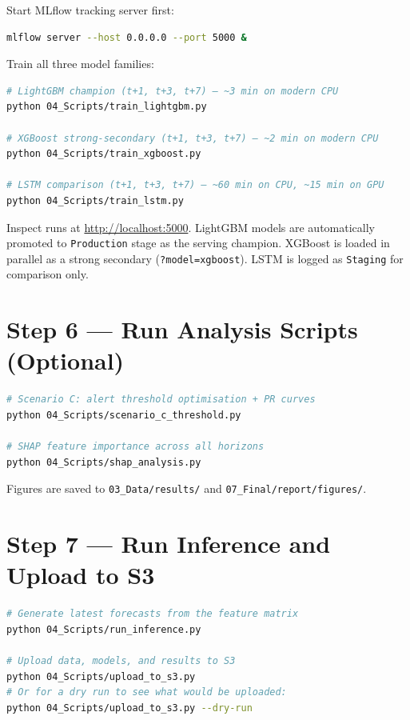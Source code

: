 Start MLflow tracking server first:

\begin{lstlisting}[language=bash]
mlflow server --host 0.0.0.0 --port 5000 &
\end{lstlisting}

Train all three model families:

\begin{lstlisting}[language=bash]
# LightGBM champion (t+1, t+3, t+7) — ~3 min on modern CPU
python 04_Scripts/train_lightgbm.py

# XGBoost strong-secondary (t+1, t+3, t+7) — ~2 min on modern CPU
python 04_Scripts/train_xgboost.py

# LSTM comparison (t+1, t+3, t+7) — ~60 min on CPU, ~15 min on GPU
python 04_Scripts/train_lstm.py
\end{lstlisting}

Inspect runs at \url{http://localhost:5000}. LightGBM models are automatically
promoted to \texttt{Production} stage as the serving champion. XGBoost is
loaded in parallel as a strong secondary (\texttt{?model=xgboost}). LSTM is
logged as \texttt{Staging} for comparison only.

\section{Step 6 — Run Analysis Scripts (Optional)}

\begin{lstlisting}[language=bash]
# Scenario C: alert threshold optimisation + PR curves
python 04_Scripts/scenario_c_threshold.py

# SHAP feature importance across all horizons
python 04_Scripts/shap_analysis.py
\end{lstlisting}

Figures are saved to \texttt{03\_Data/results/} and
\texttt{07\_Final/report/figures/}.

\section{Step 7 — Run Inference and Upload to S3}

\begin{lstlisting}[language=bash]
# Generate latest forecasts from the feature matrix
python 04_Scripts/run_inference.py

# Upload data, models, and results to S3
python 04_Scripts/upload_to_s3.py
# Or for a dry run to see what would be uploaded:
python 04_Scripts/upload_to_s3.py --dry-run
\end{lstlisting}

